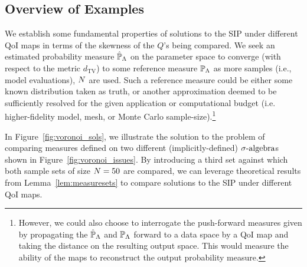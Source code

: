 \subsection{Overview of Examples}
We establish some fundamental properties of solutions to the SIP under different QoI maps in terms of the skewness of the $Q$'s being compared.
We seek an estimated probability measure $\hat{\mathbb{P}}_{\Lambda}$ on the parameter space to converge (with respect to the metric $d_\text{TV}$) to some reference measure $\mathbb{P}_{\Lambda}$ as more samples (i.e., model evaluations), $N$ are used.
Such a reference measure could be either some known distribution taken as truth, or another approximation deemed to be sufficiently resolved for the given application or computational budget (i.e. higher-fidelity model, mesh, or Monte Carlo sample-size).\footnote{However, we could also choose to interrogate the push-forward measures given by propagating the $\hat{\mathbb{P}}_{\Lambda}$ and $\mathbb{P}_{\Lambda}$ forward to a data space by a QoI map and taking the distance on the resulting output space.
This would measure the ability of the maps to reconstruct the output probability measure.}

In Figure~\ref{fig:voronoi_sols}, we illustrate the solution to the problem of comparing measures defined on two different (implicitly-defined) $\sigma\text{-algebra}$s shown in Figure~\ref{fig:voronoi_issues}.
By introducing a third set against which both sample sets of size $N=50$ are compared, we can leverage theoretical results from Lemma~\ref{lem:measuresets} to compare solutions to the SIP under different QoI maps.

